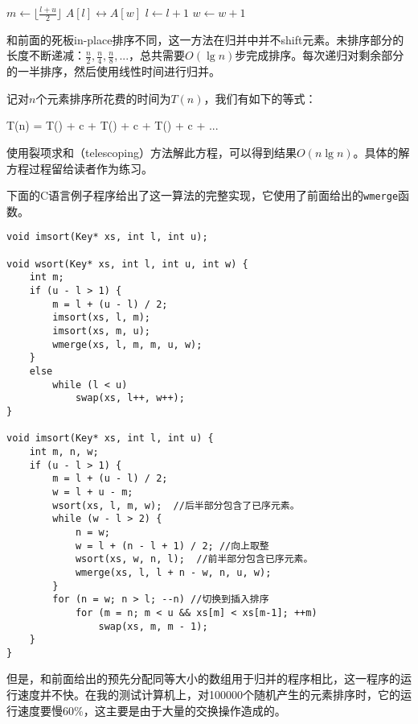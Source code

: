 \documentclass[UTF8]{article}
\begin{document}
\begin{algorithmic}[1]
    \State $m \gets \lfloor \frac{l + u}{2} \rfloor$
    \State {}
    \State {}
    \State {}
  \Else {}
      \State {} $A[l] \leftrightarrow A[w]$
      \State $l \gets l + 1$
      \State $w \gets w + 1$
    \EndWhile
  \EndIf
\EndProcedure
\end{algorithmic}

和前面的死板in-place排序不同，这一方法在归并中并不shift元素。未排序部分的长度不断递减：$\frac{n}{2}, \frac{n}{4}, \frac{n}{8}, ...$，总共需要$O(\lg n)$步完成排序。每次递归对剩余部分的一半排序，然后使用线性时间进行归并。

记对$n$个元素排序所花费的时间为$T(n)$，我们有如下的等式：

\be
T(n) = T() + c  + T() + c  + T() + c  + ...
\ee

使用裂项求和（telescoping）方法解此方程，可以得到结果$O(n \lg n)$。具体的解方程过程留给读者作为练习。

下面的C语言例子程序给出了这一算法的完整实现，它使用了前面给出的\texttt{wmerge}函数。

\lstset{language=C}
\begin{lstlisting}
void imsort(Key* xs, int l, int u);

void wsort(Key* xs, int l, int u, int w) {
    int m;
    if (u - l > 1) {
        m = l + (u - l) / 2;
        imsort(xs, l, m);
        imsort(xs, m, u);
        wmerge(xs, l, m, m, u, w);
    }
    else
        while (l < u)
            swap(xs, l++, w++);
}

void imsort(Key* xs, int l, int u) {
    int m, n, w;
    if (u - l > 1) {
        m = l + (u - l) / 2;
        w = l + u - m;
        wsort(xs, l, m, w);  //后半部分包含了已序元素。
        while (w - l > 2) {
            n = w;
            w = l + (n - l + 1) / 2; //向上取整
            wsort(xs, w, n, l);  //前半部分包含已序元素。
            wmerge(xs, l, l + n - w, n, u, w);
        }
        for (n = w; n > l; --n) //切换到插入排序
            for (m = n; m < u && xs[m] < xs[m-1]; ++m)
                swap(xs, m, m - 1);
    }
}
\end{lstlisting}

但是，和前面给出的预先分配同等大小的数组用于归并的程序相比，这一程序的运行速度并不快。在我的测试计算机上，对100000个随机产生的元素排序时，它的运行速度要慢60\%，这主要是由于大量的交换操作造成的。
\end{document}
